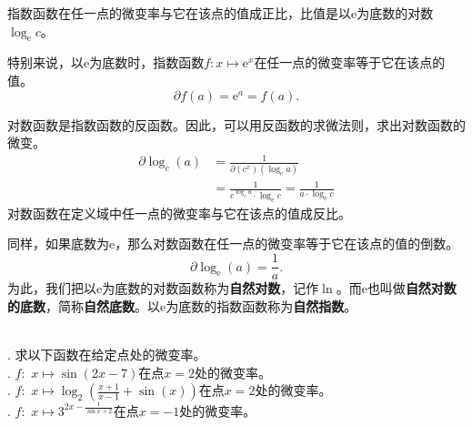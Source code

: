\documentclass[12pt,UTF8]{ctexbook}
\begin{document}
指数函数在任一点的微变率与它在该点的值成正比，比值是以$\mathrm{e}$为底数的对数$\log_{\mathrm{e}}{c}$。

特别来说，以$\mathrm{e}$为底数时，指数函数$f: x\mapsto \mathrm{e}^x$在任一点的微变率等于它在该点的值。
$$ \partial f (a) = \mathrm{e}^a = f(a).$$

对数函数是指数函数的反函数。因此，可以用反函数的求微法则，求出对数函数的微变。
\begin{align*}
    \partial \log_c (a) &= \frac{1}{\partial (c^x) (\log_c{a})}  \\
    &= \frac{1}{c^{\log_c{a}} \cdot \log_{\mathrm{e}}{c}} = \frac{1}{a \cdot \log_{\mathrm{e}}{c}}   
\end{align*}
对数函数在定义域中任一点的微变率与它在该点的值成反比。

同样，如果底数为$\mathrm{e}$，那么对数函数在任一点的微变率等于它在该点的值的倒数。
$$ \partial \log_{\mathrm{e}} (a) = \frac{1}{a}.$$
为此，我们把以$\mathrm{e}$为底数的对数函数称为\textbf{自然对数}，记作$\ln$。而$\mathrm{e}$也叫做\textbf{自然对数的底数}，简称\textbf{自然底数}。以$\mathrm{e}$为底数的指数函数称为\textbf{自然指数}。

\begin{et}
    \mbox{} \\
    . 求以下函数在给定点处的微变率。\\
    . $f: \,\, x \mapsto \sin{(2x - 7)}$在点$x = 2$处的微变率。\\
    . $f: \,\, x \mapsto \log_2{\left(\frac{x+1}{x-1} + \sin(x)\right)}$在点$x = 2$处的微变率。\\
    . $f: \,\, x \mapsto 3^{2x - \frac{1}{\sin{x} + 2}}$在点$x = -1$处的微变率。\\
\end{et}
\end{document}
